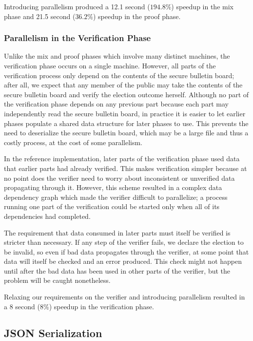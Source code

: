 Introducing parallelism produced a 12.1 second ($194.8\%$) speedup in the mix phase and 21.5 second ($36.2\%$) speedup in the proof phase.

\subsubsection{Parallelism in the Verification Phase}

Unlike the mix and proof phases which involve many distinct machines, the verification phase occurs on a single machine. However, all parts of the verification process only depend on the contents of the secure bulletin board; after all, we expect that any member of the public may take the contents of the secure bulletin board and verify the election outcome herself. Although no part of the verification phase depends on any previous part because each part may independently read the secure bulletin board, in practice it is easier to let earlier phases populate a shared data structure for later phases to use. This prevents the need to deserialize the secure bulletin board, which may be a large file and thus a costly process, at the cost of some parallelism.

In the reference implementation, later parts of the verification phase used data that earlier parts had already verified. This makes verification simpler because at no point does the verifier need to worry about inconsistent or unverified data propagating through it. However, this scheme resulted in a complex data dependency graph which made the verifier difficult to parallelize; a process running one part of the verification could be started only when all of its dependencies had completed.

The requirement that data consumed in later parts must itself be verified is stricter than necessary. If any step of the verifier fails, we declare the election to be invalid, so even if bad data propagates through the verifier, at some point that data will itself be checked and an error produced. This check might not happen until after the bad data has been used in other parts of the verifier, but the problem will be caught nonetheless.

Relaxing our requirements on the verifier and introducing parallelism resulted in a 8 second ($8\%$) speedup in the verification phase.

\subsection{JSON Serialization}

